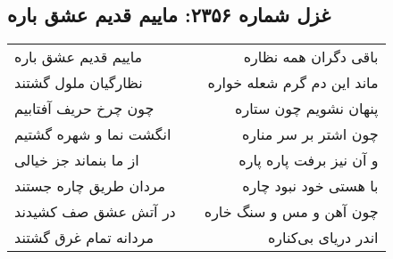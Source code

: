 \begin{center}
\section*{غزل شماره ۲۳۵۶: ماییم قدیم عشق باره}
\label{sec:2356}
\begin{longtable}{l p{0.5cm} r}
ماییم قدیم عشق باره
&&
باقی دگران همه نظاره
\\
نظارگیان ملول گشتند
&&
ماند این دم گرم شعله خواره
\\
چون چرخ حریف آفتابیم
&&
پنهان نشویم چون ستاره
\\
انگشت نما و شهره گشتیم
&&
چون اشتر بر سر مناره
\\
از ما بنماند جز خیالی
&&
و آن نیز برفت پاره پاره
\\
مردان طریق چاره جستند
&&
با هستی خود نبود چاره
\\
در آتش عشق صف کشیدند
&&
چون آهن و مس و سنگ خاره
\\
مردانه تمام غرق گشتند
&&
اندر دریای بی‌کناره
\\
\end{longtable}
\end{center}
